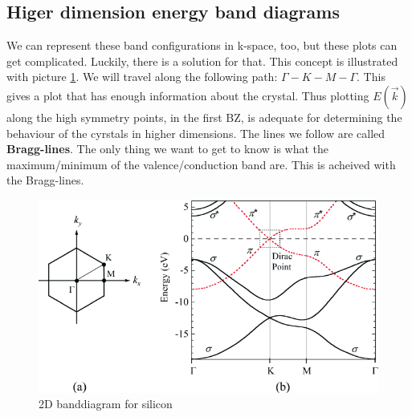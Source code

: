 \subsection{Higer dimension energy band diagrams}
We can represent these band configurations in k-space, too, but these plots can get complicated. Luckily, there is a solution for that. This concept is illustrated with picture \ref{fig:banddiagram_silicon}. We will travel along the following path: $\Gamma - K - M - \Gamma$. This gives a plot that has enough information about the crystal. Thus plotting $E(\vec{k})$ along the high symmetry points, in the first BZ, is adequate for determining the behaviour of the cyrstals in higher dimensions. The lines we follow are called \textbf{Bragg-lines}. The only thing we want to get to know is what the maximum/minimum of the valence/conduction band are. This is acheived with the Bragg-lines.
\begin{figure}
	\centering
	\includegraphics[scale=0.5]{./banddiagram_silicon.png}
	\caption{2D banddiagram for silicon}
	\label{fig:banddiagram_silicon}
\end{figure}
